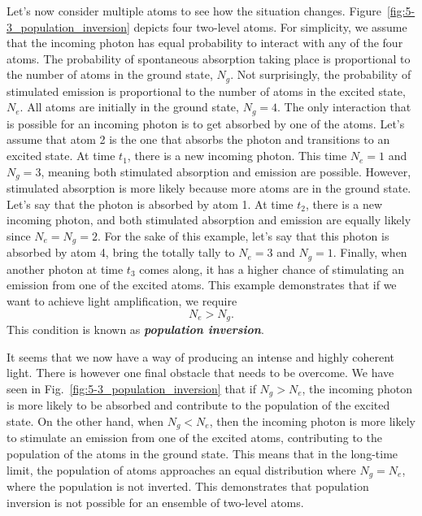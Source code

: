 Let's now consider multiple atoms to see how the situation changes.
Figure~\ref{fig:5-3_population_inversion} depicts four two-level atoms.
For simplicity, we assume that the incoming photon has equal probability to interact with any of the four atoms.
The probability of spontaneous absorption taking place is proportional to the number of atoms in the ground state, $N_g$.
Not surprisingly, the probability of stimulated emission is proportional to the number of atoms in the excited state, $N_e$.
All atoms are initially in the ground state, $N_g=4$.
The only interaction that is possible for an incoming photon is to get absorbed by one of the atoms.
Let's assume that atom 2 is the one that absorbs the photon and transitions to an excited state.
At time $t_1$, there is a new incoming photon.
This time $N_e=1$ and $N_g=3$, meaning both stimulated absorption and emission are possible.
However, stimulated absorption is more likely because more atoms are in the ground state.
Let's say that the photon is absorbed by atom 1.
At time $t_2$, there is a new incoming photon, and both stimulated absorption and emission are equally likely since $N_e=N_g=2$.
For the sake of this example, let's say that this photon is absorbed by atom 4, bring the totally tally to $N_e=3$ and $N_g=1$.
Finally, when another photon at time $t_3$ comes along, it has a higher chance of stimulating an emission from one of the excited atoms.
This example demonstrates that if we want to achieve light amplification, we require
\begin{equation}
    N_e > N_g.
\end{equation}
This condition is known as \textit{\textbf{population inversion}}.

It seems that we now have a way of producing an intense and highly coherent light.
There is however one final obstacle that needs to be overcome.
We have seen in Fig.~\ref{fig:5-3_population_inversion} that if $N_g > N_e$, the incoming photon is more likely to be absorbed and contribute to the population of the excited state.
On the other hand, when $N_g < N_e$, then the incoming photon is more likely to stimulate an emission from one of the excited atoms, contributing to the population of the atoms in the ground state.
This means that in the long-time limit, the population of atoms approaches an equal distribution where $N_g = N_e$, where the population is not inverted.
This demonstrates that population inversion is not possible for an ensemble of two-level atoms.



